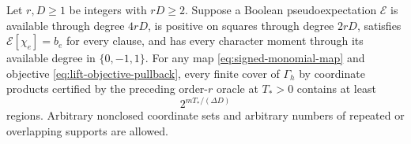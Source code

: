 \begin{theorem}
\label{thm:monomial-transfer}
Let $r,D\ge1$ be integers with $rD\ge2$. Suppose a Boolean
pseudoexpectation $\mathcal E$ is available through degree $4rD$, is
positive on squares through degree $2rD$, satisfies
$\mathcal E[\chi_e]=b_e$ for every clause, and has every character moment
through its available degree in $\{0,-1,1\}$. For any map
\eqref{eq:signed-monomial-map} and objective
\eqref{eq:lift-objective-pullback}, every finite cover of $\Gamma_h$ by
coordinate products certified by the preceding order-$r$ oracle at
$T_*>0$ contains at least
\begin{equation}\label{eq:monomial-transfer-count}
 2^{mT_*/(\Delta D)}
\end{equation}
regions. Arbitrary nonclosed coordinate sets and arbitrary numbers of
repeated or overlapping supports are allowed.
\end{theorem}
